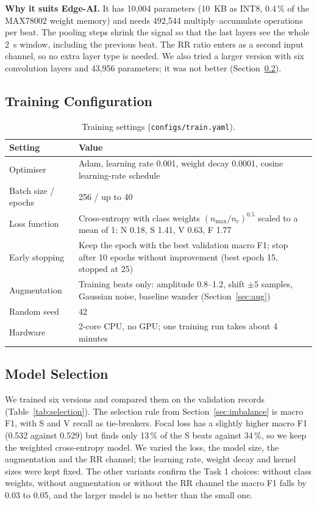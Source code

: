 \documentclass[11pt,a4paper]{article}
\newcommand{\code}[1]{\texttt{#1}}
\begin{document}
\textbf{Why it suits Edge-AI.} It has 10,004 parameters (10~KB as INT8, 0.4\,\% of the MAX78002 weight memory) and needs 492,544 multiply--accumulate operations per beat. The pooling steps shrink the signal so that the last layers see the whole 2~s window, including the previous beat. The RR ratio enters as a second input channel, so no extra layer type is needed. We also tried a larger version with six convolution layers and 43,956 parameters; it was not better (Section~\ref{sec:selection}).

\subsection{Training Configuration}

\begin{table}[H]
\centering
\small
\caption{Training settings (\code{configs/train.yaml}).}
\label{tab:trainconf}
\begin{tabularx}{\textwidth}{@{} l L @{}}
\toprule
Setting & Value \\
\midrule
Optimiser & Adam, learning rate 0.001, weight decay 0.0001, cosine learning-rate schedule \\
Batch size / epochs & 256 / up to 40 \\
Loss function & Cross-entropy with class weights $(n_{\max}/n_c)^{0.5}$ scaled to a mean of 1: N 0.18, S 1.41, V 0.63, F 1.77 \\
Early stopping & Keep the epoch with the best validation macro F1; stop after 10 epochs without improvement (best epoch 15, stopped at 25) \\
Augmentation & Training beats only: amplitude 0.8--1.2, shift $\pm 5$ samples, Gaussian noise, baseline wander (Section~\ref{sec:aug}) \\
Random seed & 42 \\
Hardware & 2-core CPU, no GPU; one training run takes about 4 minutes \\
\bottomrule
\end{tabularx}
\end{table}

\subsection{Model Selection}
\label{sec:selection}

We trained six versions and compared them on the validation records (Table~\ref{tab:selection}). The selection rule from Section~\ref{sec:imbalance} is macro F1, with S and V recall as tie-breakers. Focal loss has a slightly higher macro F1 (0.532 against 0.529) but finds only 13\,\% of the S beats against 34\,\%, so we keep the weighted cross-entropy model. We varied the loss, the model size, the augmentation and the RR channel; the learning rate, weight decay and kernel sizes were kept fixed. The other variants confirm the Task 1 choices: without class weights, without augmentation or without the RR channel the macro F1 falls by 0.03 to 0.05, and the larger model is no better than the small one.
\end{document}
